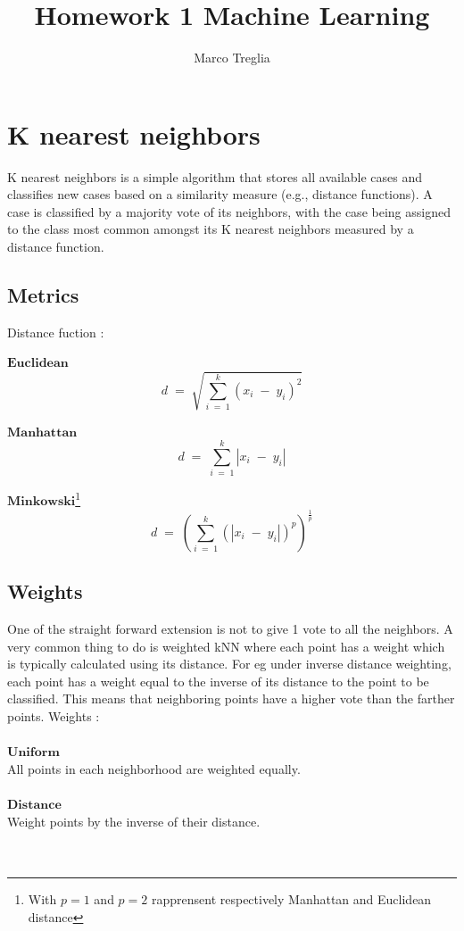 \documentclass[11pt]{article}
\theoremstyle{plain}
\begin{document}
\title{Homework 1 Machine Learning}
\author{Marco Treglia}
\date{}
\maketitle

\section{K nearest neighbors}
K nearest neighbors is a simple algorithm that stores all available cases and classifies new cases based on a similarity measure (e.g., distance functions).
A case is classified by a majority vote of its neighbors, with the case being assigned to the class most common amongst its K nearest neighbors measured by a distance function.
\subsection{Metrics}
Distance fuction : 

$\bm{Euclidean  }$
$$d\; =\; \sqrt{\sum_{i\; =\; 1}^{k}{\left( x_{i}\; -\; y_{i} \right)^{2}}} $$


$\bm{Manhattan  }$
$$ d\; =\; \sum_{i\; =\; 1}^{k}{\left| x_{i}\; -\; y_{i} \right|} $$


$\bm{Minkowski  }$\footnote{With $p=1$ and $p=2$ rapprensent respectively Manhattan and  Euclidean distance }
$$d\; =\; \left( \sum_{i\; =\; 1}^{k}{\left( \left| x_{i}\; -\; y_{i} \right| \right)^{p}} \right)^{\frac{1}{p}} $$


\subsection{Weights}
One of the straight forward extension is not to give 1 vote to all the neighbors. A very common thing to do is weighted kNN where each point has a weight which is typically calculated using its distance. For eg under inverse distance weighting, each point has a weight equal to the inverse of its distance to the point to be classified. This means that neighboring points have a higher vote than the farther points. Weights : 
\\ \\
$\bm{Uniform  }$
\\
All points in each neighborhood are weighted equally.
\\ \\
$\bm{Distance  }$
\\
 Weight points by the inverse of their distance.
\\
\\
\\
\end{document}
